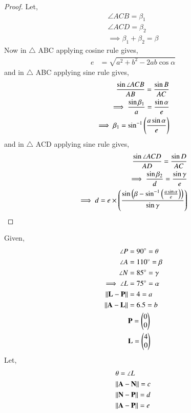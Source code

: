 \documentclass[journal,12pt,twocolumn]{IEEEtran}
\begin{document}
\begin{proof}
    Let,
    \begin{align}
        \angle {ACB} = \beta_1\\
        \angle {ACD} = \beta_2\\
        \implies \beta_1 + \beta_2 = \beta \label{a}
    \end{align}
    Now in $\triangle$ ABC applying cosine rule gives,
    \begin{align}
        e &= \sqrt{a^2+b^2-2ab\cos{\alpha}}
    \end{align}
    and in $\triangle$ ABC applying sine rule gives,
    \begin{align}
        \frac{\sin{\angle{ACB}}}{AB} = \frac{\sin B}{AC}\\
        \implies \frac{\sin{\beta_1}}{a} = \frac{\sin{\alpha}}{e}\\
        \implies \beta_1 = \sin^{-1}\left(\frac{a\sin\alpha}{e}\right)   \label{b}     
    \end{align}
    and in $\triangle$ ACD applying sine rule gives,
    \begin{align}
        \frac{\sin{\angle{ACD}}}{AD} = \frac{\sin D}{AC}\\
        \implies \frac{\sin{\beta_2}}{d} = \frac{\sin{\gamma}}{e}\\
        \implies d = e\times\left(\frac{\sin{\ensuremath{\left(\beta-\sin^{-1}\left({\frac{a\sin\alpha}{e}}\right)\right)}}}{\sin\gamma}\right)
    \end{align}
\end{proof}
Given, 
\begin{align}
    \angle P &= 90^\circ = \theta\\
    \angle A &= 110^\circ = \beta\\
    \angle N &= 85^\circ = \gamma\\
    \implies \angle L &= 75^\circ = \alpha\\
    \lVert\mathbf{L}-\mathbf{P}\rVert &= 4 = a\\
    \lVert\mathbf{A}-\mathbf{L}\rVert &= 6.5 = b\\
    &\mathbf{P} = \begin{pmatrix}0\\
                     0\end{pmatrix}\\
    &\mathbf{L} = \begin{pmatrix}4\\
                      0\end{pmatrix}
\end{align}
Let,
\begin{align}
    &\theta = \angle L\\
    &\lVert\mathbf{A}-\mathbf{N}\rVert = c\\
    &\lVert\mathbf{N}-\mathbf{P}\rVert = d\\
    &\lVert\mathbf{A}-\mathbf{P}\rVert = e
\end{align}
\end{document}
